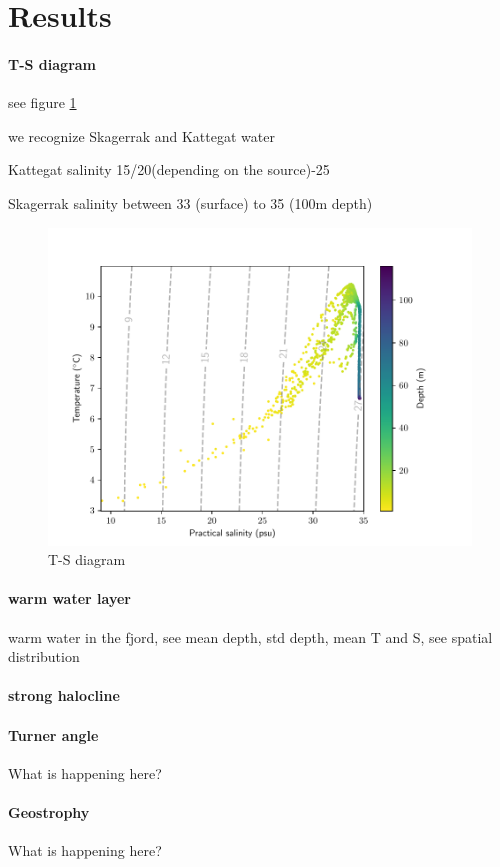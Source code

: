 \documentclass[12pt,a4paper]{article}
\begin{document}
\section{Results}

\paragraph{T-S diagram}
see figure \ref{fig:ts}

we recognize Skagerrak and Kattegat water \citep{bjork2003,gustafsson1996}

Kattegat salinity 15/20(depending on the source)-25

Skagerrak salinity between 33 (surface) to 35 (100m depth)

\begin{figure}
  \centering
  \includegraphics[width=.7\textwidth]{ts_conv}
  \caption{\label{fig:ts}T-S diagram}
\end{figure}

\paragraph{warm water layer}
warm water in the fjord, see mean depth, std depth, mean T and S, see spatial
distribution

\paragraph{strong halocline}

\paragraph{Turner angle}
What is happening here?

\paragraph{Geostrophy}
What is happening here?
\end{document}
